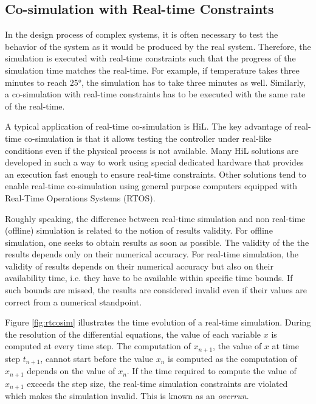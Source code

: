 \subsection{Co-simulation with Real-time Constraints}

In the design process of complex systems, it is often necessary to test the behavior of the system as it would be produced by the real system. Therefore, the simulation is executed with real-time constraints such that the progress of the simulation time matches the real-time. For example, if temperature takes three minutes to reach $25$°, the simulation has to take three minutes as well. Similarly, a co-simulation with real-time constraints has to be executed with the same rate of the real-time.

A typical application of real-time co-simulation is HiL. The key advantage of real-time co-simulation is that it allows testing the controller under real-like conditions even if the physical process is not available. Many HiL solutions are developed in such a way to work using special dedicated hardware that provides an execution fast enough to ensure real-time constraints. Other solutions tend to enable real-time co-simulation using general purpose computers equipped with Real-Time Operations Systems (RTOS).

Roughly speaking, the difference between real-time simulation and non real-time (offline) simulation is related to the notion of results validity. For offline simulation, one seeks to obtain results as soon as possible. The validity of the the results depends only on their numerical accuracy. For real-time simulation, the validity of results depends on their numerical accuracy but also on their availability time, i.e. they have to be available within specific time bounds. If such bounds are missed, the results are considered invalid even if their values are correct from a numerical standpoint.

Figure \ref{fig:rtcosim} illustrates the time evolution of a real-time simulation. During the resolution of the differential equations, the value of each variable $x$ is computed at every time step. The computation of $x_{n+1}$, the value of $x$ at time step $t_{n+1}$, cannot start before the value $x_n$ is computed as the computation of $x_{n+1}$ depends on the value of $x_n$. If the time required to compute the value of $x_{n+1}$ exceeds the step size, the real-time simulation constraints are violated which makes the simulation invalid. This is known as an \textit{overrun}.

